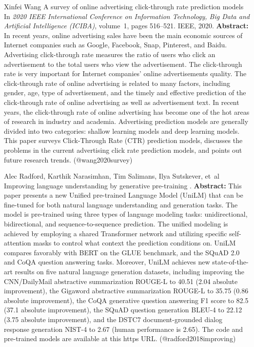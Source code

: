 \documentclass{article}
\begin{document}
\begin{thebibliography}{}
 Xinfei Wang \newblock A survey of online advertising click-through rate prediction models \newblock In {\em 2020 IEEE International Conference on Information Technology, Big Data and Artificial Intelligence (ICIBA)}, volume~1, pages 516--521. IEEE, 2020. \newblock \textbf{Abstract:} In recent years, online advertising sales have been the main economic sources of Internet companies such as Google, Facebook, Snap, Pinterest, and Baidu. Advertising click-through rate measures the ratio of users who click an advertisement to the total users who view the advertisement. The click-through rate is very important for Internet companies' online advertisements quality. The click-through rate of online advertising is related to many factors, including gender, age, type of advertisement, and the timely and effective prediction of the click-through rate of online advertising as well as advertisement text. In recent years, the click-through rate of online advertising has become one of the hot areas of research in industry and academia. Advertising prediction models are generally divided into two categories: shallow learning models and deep learning models. This paper surveys Click-Through Rate (CTR) prediction models, discusses the problems in the current advertising click rate prediction models, and points out future research trends. \newblock (@wang2020survey)

 Alec Radford, Karthik Narasimhan, Tim Salimans, Ilya Sutskever, et~al \newblock Improving language understanding by generative pre-training . \newblock \textbf{Abstract:} This paper presents a new Unified pre-trained Language Model (UniLM) that can be fine-tuned for both natural language understanding and generation tasks. The model is pre-trained using three types of language modeling tasks: unidirectional, bidirectional, and sequence-to-sequence prediction. The unified modeling is achieved by employing a shared Transformer network and utilizing specific self-attention masks to control what context the prediction conditions on. UniLM compares favorably with BERT on the GLUE benchmark, and the SQuAD 2.0 and CoQA question answering tasks. Moreover, UniLM achieves new state-of-the-art results on five natural language generation datasets, including improving the CNN/DailyMail abstractive summarization ROUGE-L to 40.51 (2.04 absolute improvement), the Gigaword abstractive summarization ROUGE-L to 35.75 (0.86 absolute improvement), the CoQA generative question answering F1 score to 82.5 (37.1 absolute improvement), the SQuAD question generation BLEU-4 to 22.12 (3.75 absolute improvement), and the DSTC7 document-grounded dialog response generation NIST-4 to 2.67 (human performance is 2.65). The code and pre-trained models are available at this https URL. \newblock (@radford2018improving)


\end{thebibliography}
\end{document}
